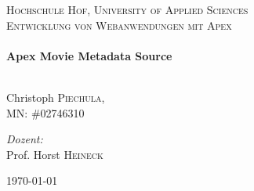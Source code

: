 \begin{titlepage}

\begin{center}

\textsc{\LARGE  Hochschule Hof, University of Applied Sciences}\\[1.5cm]
\textsc{\Large Entwicklung von Webanwendungen mit Apex}\\[0.5cm]

\HRule \\[0.4cm]
{\huge \bfseries Apex Movie Metadata Source}\\[0.4cm]

\HRule \\[1.5cm]

\begin{minipage}{0.4\textwidth}
\begin{flushleft} \large
Christoph \textsc{Piechula},\\
MN: \#02746310\\
\end{flushleft}
\end{minipage}
\begin{minipage}{0.4\textwidth}
\begin{flushright} \large
\emph{Dozent:} \\
Prof. Horst \textsc{Heineck}
\end{flushright}
\end{minipage}

\vfill

{\large \today}

\end{center}

\end{titlepage}

